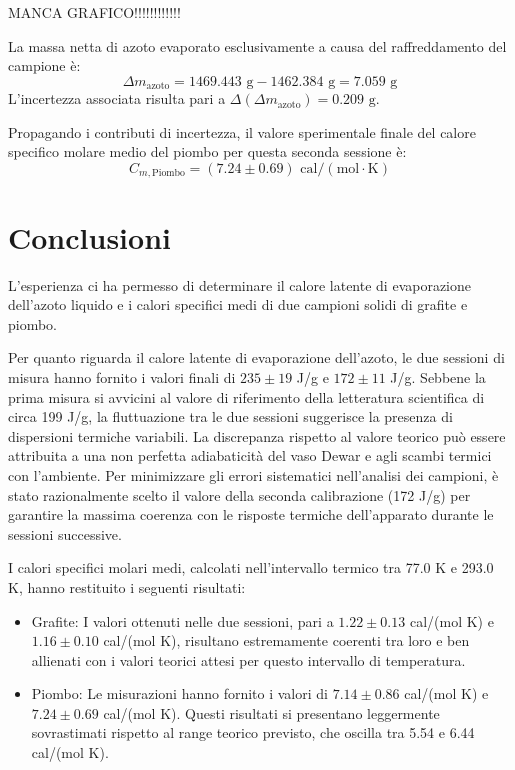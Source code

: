\documentclass[a4paper,12pt]{article}
\begin{document}
\par\vspace{0.5cm} 
MANCA GRAFICO!!!!!!!!!!!!


La massa netta di azoto evaporato esclusivamente a causa del raffreddamento del campione è:
\begin{equation*}
    \Delta m_{\text{azoto}} = 1469.443\text{ g} - 1462.384\text{ g} = 7.059\text{ g}
\end{equation*}
L'incertezza associata risulta pari a $\Delta(\Delta m_{\text{azoto}}) = 0.209\text{ g}$.

Propagando i contributi di incertezza, il valore sperimentale finale del calore specifico molare medio del piombo per questa seconda sessione è:
\begin{equation*}
    C_{m, \text{Piombo}} = (7.24 \pm 0.69)\text{ cal}/(\text{mol}\cdot\text{K})
\end{equation*}

\section{Conclusioni}

L'esperienza ci ha permesso di determinare il calore latente di evaporazione dell'azoto
liquido e i calori specifici medi di due campioni solidi di grafite e piombo.

Per quanto riguarda il calore latente di evaporazione dell'azoto, le due sessioni di misura hanno
fornito i valori finali di $235 \pm 19$ J/g e $172 \pm 11$ J/g.
Sebbene la prima misura si avvicini al valore di riferimento della letteratura scientifica
di circa 199 J/g, la fluttuazione tra le due sessioni suggerisce la presenza di dispersioni
termiche variabili.
La discrepanza rispetto al valore teorico può essere attribuita a una non perfetta
adiabaticità del vaso Dewar e agli scambi termici con l'ambiente.
Per minimizzare gli errori sistematici nell'analisi dei campioni, è stato razionalmente
scelto il valore della seconda calibrazione (172 J/g) per garantire la massima coerenza con le 
risposte termiche dell'apparato durante le sessioni successive.

I calori specifici molari medi, calcolati nell'intervallo termico tra 77.0 K e 293.0 K, hanno restituito
i seguenti risultati:
\begin{itemize}
    \item Grafite: I valori ottenuti nelle due sessioni, pari a $1.22 \pm 0.13$ cal/(mol K) e $1.16 \pm 0.10$ cal/(mol K), risultano estremamente coerenti tra loro e ben allienati con i valori teorici attesi per questo intervallo di temperatura.
    \item Piombo: Le misurazioni hanno fornito i valori di $7.14 \pm 0.86$ cal/(mol K) e $7.24 \pm 0.69$ cal/(mol K). Questi risultati si presentano leggermente sovrastimati rispetto al range teorico previsto, che oscilla tra 5.54 e 6.44 cal/(mol K).
\end{itemize}
\end{document}
